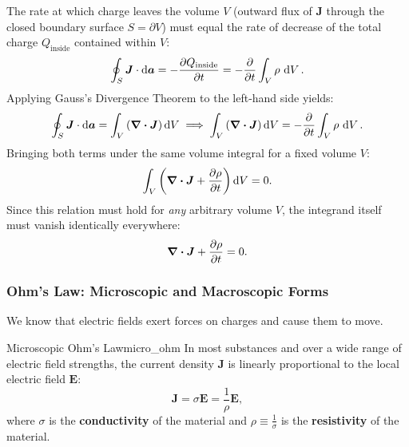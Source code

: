 \begin{proofbox}
The rate at which charge leaves the volume $V$ (outward flux of $\bm{J}$ through the closed boundary surface $S = \partial V$) must equal the rate of decrease of the total charge $Q_{\text{inside}}$ contained within $V$:
\begin{equation*}
    \oint_S \bm{J} \cdot \dd{\bm{a}} = -\pdv{Q_{\text{inside}}}{t} = -\pdv{t} \int_V \rho \, \dd{V}.
\end{equation*}
Applying Gauss's Divergence Theorem to the left-hand side yields:
\begin{equation*}
    \oint_S \bm{J} \cdot \dd{\bm{a}} = \int_V \left(\div{\bm{J}}\right) \dd{V} \implies \int_V \left(\div{\bm{J}}\right) \dd{V} = -\pdv{t} \int_V \rho \, \dd{V}.
\end{equation*}
Bringing both terms under the same volume integral for a fixed volume $V$:
\begin{equation*}
    \int_V \left( \div{\bm{J}} + \pdv{\rho}{t} \right) \dd{V} = 0.
\end{equation*}
Since this relation must hold for \emph{any} arbitrary volume $V$, the integrand itself must vanish identically everywhere:
\begin{equation*}
    \div{\bm{J}} + \pdv{\rho}{t} = 0.
\end{equation*}
\end{proofbox}

\subsubsection{Ohm's Law: Microscopic and Macroscopic Forms}

We know that electric fields exert forces on charges and cause them to move.

\begin{proposition}{Microscopic Ohm's Law}{micro_ohm}
In most substances and over a wide range of electric field strengths, the current density $\bm{J}$ is linearly proportional to the local electric field $\bm{E}$:
\begin{equation}
    \bm{J} = \sigma \bm{E} = \frac{1}{\rho} \bm{E},
\end{equation}
where $\sigma$ is the \textbf{conductivity} of the material and $\rho \equiv \frac{1}{\sigma}$ is the \textbf{resistivity} of the material.
\end{proposition}

